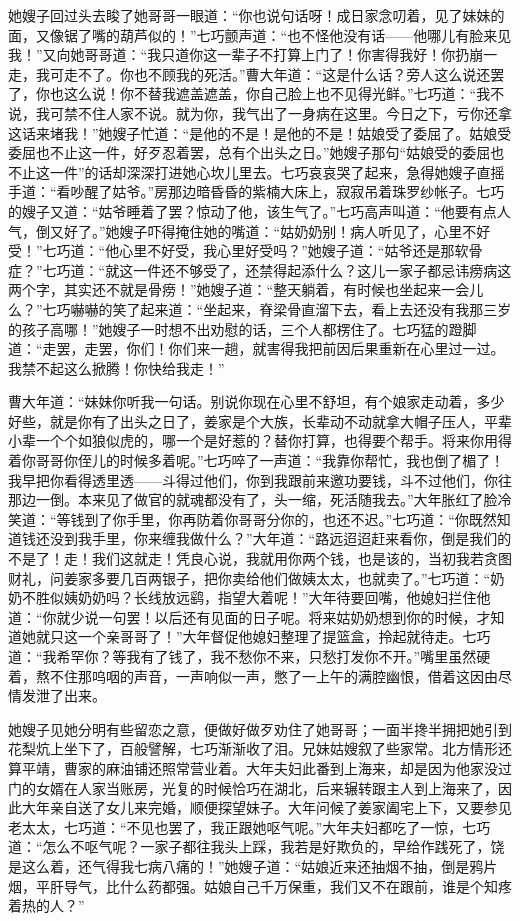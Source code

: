 \par 她嫂子回过头去睃了她哥哥一眼道：“你也说句话呀！成日家念叨着，见了妹妹的面，又像锯了嘴的葫芦似的！”七巧颤声道：“也不怪他没有话——他哪儿有脸来见我！”又向她哥哥道：“我只道你这一辈子不打算上门了！你害得我好！你扔崩一走，我可走不了。你也不顾我的死活。”曹大年道：“这是什么话？旁人这么说还罢了，你也这么说！你不替我遮盖遮盖，你自己脸上也不见得光鲜。”七巧道：“我不说，我可禁不住人家不说。就为你，我气出了一身病在这里。今日之下，亏你还拿这话来堵我！”她嫂子忙道：“是他的不是！是他的不是！姑娘受了委屈了。姑娘受委屈也不止这一件，好歹忍着罢，总有个出头之日。”她嫂子那句“姑娘受的委屈也不止这一件”的话却深深打进她心坎儿里去。七巧哀哀哭了起来，急得她嫂子直摇手道：“看吵醒了姑爷。”房那边暗昏昏的紫楠大床上，寂寂吊着珠罗纱帐子。七巧的嫂子又道：“姑爷睡着了罢？惊动了他，该生气了。”七巧高声叫道：“他要有点人气，倒又好了。”她嫂子吓得掩住她的嘴道：“姑奶奶别！病人听见了，心里不好受！”七巧道：“他心里不好受，我心里好受吗？”她嫂子道：“姑爷还是那软骨症？”七巧道：“就这一件还不够受了，还禁得起添什么？这儿一家子都忌讳痨病这两个字，其实还不就是骨痨！”她嫂子道：“整天躺着，有时候也坐起来一会儿么？”七巧嚇嚇的笑了起来道：“坐起来，脊梁骨直溜下去，看上去还没有我那三岁的孩子高哪！”她嫂子一时想不出劝慰的话，三个人都楞住了。七巧猛的蹬脚道：“走罢，走罢，你们！你们来一趟，就害得我把前因后果重新在心里过一过。我禁不起这么掀腾！你快给我走！”
\par 曹大年道：“妹妹你听我一句话。别说你现在心里不舒坦，有个娘家走动着，多少好些，就是你有了出头之日了，姜家是个大族，长辈动不动就拿大帽子压人，平辈小辈一个个如狼似虎的，哪一个是好惹的？替你打算，也得要个帮手。将来你用得着你哥哥你侄儿的时候多着呢。”七巧啐了一声道：“我靠你帮忙，我也倒了楣了！我早把你看得透里透——斗得过他们，你到我跟前来邀功要钱，斗不过他们，你往那边一倒。本来见了做官的就魂都没有了，头一缩，死活随我去。”大年胀红了脸冷笑道：“等钱到了你手里，你再防着你哥哥分你的，也还不迟。”七巧道：“你既然知道钱还没到我手里，你来缠我做什么？”大年道：“路远迢迢赶来看你，倒是我们的不是了！走！我们这就走！凭良心说，我就用你两个钱，也是该的，当初我若贪图财礼，问姜家多要几百两银子，把你卖给他们做姨太太，也就卖了。”七巧道：“奶奶不胜似姨奶奶吗？长线放远鹞，指望大着呢！”大年待要回嘴，他媳妇拦住他道：“你就少说一句罢！以后还有见面的日子呢。将来姑奶奶想到你的时候，才知道她就只这一个亲哥哥了！”大年督促他媳妇整理了提篮盒，拎起就待走。七巧道：“我希罕你？等我有了钱了，我不愁你不来，只愁打发你不开。”嘴里虽然硬着，熬不住那呜咽的声音，一声响似一声，憋了一上午的满腔幽恨，借着这因由尽情发泄了出来。
\par 她嫂子见她分明有些留恋之意，便做好做歹劝住了她哥哥；一面半搀半拥把她引到花梨炕上坐下了，百般譬解，七巧渐渐收了泪。兄妹姑嫂叙了些家常。北方情形还算平靖，曹家的麻油铺还照常营业着。大年夫妇此番到上海来，却是因为他家没过门的女婿在人家当账房，光复的时候恰巧在湖北，后来辗转跟主人到上海来了，因此大年亲自送了女儿来完婚，顺便探望妹子。大年问候了姜家阖宅上下，又要参见老太太，七巧道：“不见也罢了，我正跟她呕气呢。”大年夫妇都吃了一惊，七巧道：“怎么不呕气呢？一家子都往我头上踩，我若是好欺负的，早给作践死了，饶是这么着，还气得我七病八痛的！”她嫂子道：“姑娘近来还抽烟不抽，倒是鸦片烟，平肝导气，比什么药都强。姑娘自己千万保重，我们又不在跟前，谁是个知疼着热的人？”
